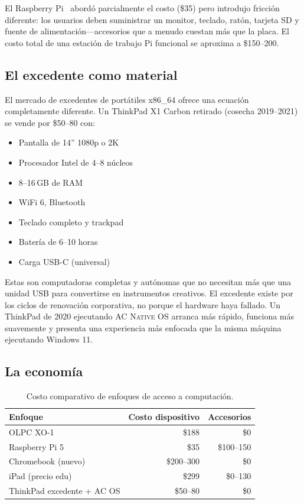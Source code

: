\documentclass[10pt,letterpaper,twocolumn]{article}
\newcommand{\acos}{\textsc{AC Native OS}}
\begin{document}
El Raspberry Pi~\citep{raspberry2012} abordó parcialmente el costo (\$35) pero introdujo fricción diferente: los usuarios deben suministrar un monitor, teclado, ratón, tarjeta SD y fuente de alimentación---accesorios que a menudo cuestan más que la placa. El costo total de una estación de trabajo Pi funcional se aproxima a \$150--200.

\subsection{El excedente como material}

El mercado de excedentes de portátiles x86\_64 ofrece una ecuación completamente diferente. Un ThinkPad X1 Carbon retirado (cosecha 2019--2021) se vende por \$50--80 con:

\begin{itemize}
  \item Pantalla de 14'' 1080p o 2K
  \item Procesador Intel de 4--8 núcleos
  \item 8--16\,GB de RAM
  \item WiFi 6, Bluetooth
  \item Teclado completo y trackpad
  \item Batería de 6--10 horas
  \item Carga USB-C (universal)
\end{itemize}

Estas son computadoras completas y autónomas que no necesitan más que una unidad USB para convertirse en instrumentos creativos. El excedente existe por los ciclos de renovación corporativa, no porque el hardware haya fallado. Un ThinkPad de 2020 ejecutando \acos{} arranca más rápido, funciona más suavemente y presenta una experiencia más enfocada que la misma máquina ejecutando Windows 11.

\subsection{La economía}

\begin{table}[h]
\small
\centering
\begin{tabular}{lrr}
\toprule
\textbf{Enfoque} & \textbf{Costo dispositivo} & \textbf{Accesorios} \\
\midrule
OLPC XO-1 & \$188 & \$0 \\
Raspberry Pi 5 & \$35 & \$100--150 \\
Chromebook (nuevo) & \$200--300 & \$0 \\
iPad (precio edu) & \$299 & \$0--130 \\
ThinkPad excedente + AC OS & \$50--80 & \$0 \\
\bottomrule
\end{tabular}
\caption{Costo comparativo de enfoques de acceso a computación.}
\label{tab:cost}
\end{table}
\end{document}
